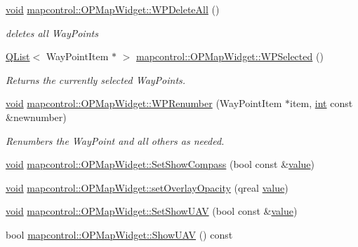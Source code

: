 \begin{DoxyCompactItemize}
\hyperlink{group___u_a_v_objects_plugin_ga444cf2ff3f0ecbe028adce838d373f5c}{void} \hyperlink{group___o_p_map_widget_ga2dd5bd06f443a496f6f81464ef44b614}{mapcontrol\-::\-O\-P\-Map\-Widget\-::\-W\-P\-Delete\-All} ()
\begin{DoxyCompactList}\small\item\em deletes all Way\-Points \end{DoxyCompactList}\item 
\hyperlink{class_q_list}{Q\-List}$<$ Way\-Point\-Item $\ast$ $>$ \hyperlink{group___o_p_map_widget_ga6051fad972405dd8b2a27196b4569684}{mapcontrol\-::\-O\-P\-Map\-Widget\-::\-W\-P\-Selected} ()
\begin{DoxyCompactList}\small\item\em Returns the currently selected Way\-Points. \end{DoxyCompactList}\item 
\hyperlink{group___u_a_v_objects_plugin_ga444cf2ff3f0ecbe028adce838d373f5c}{void} \hyperlink{group___o_p_map_widget_gaba5ee1743df3dee15e552f21a0c5d141}{mapcontrol\-::\-O\-P\-Map\-Widget\-::\-W\-P\-Renumber} (Way\-Point\-Item $\ast$item, \hyperlink{ioapi_8h_a787fa3cf048117ba7123753c1e74fcd6}{int} const \&newnumber)
\begin{DoxyCompactList}\small\item\em Renumbers the Way\-Point and all others as needed. \end{DoxyCompactList}\item 
\hyperlink{group___u_a_v_objects_plugin_ga444cf2ff3f0ecbe028adce838d373f5c}{void} \hyperlink{group___o_p_map_widget_ga6f97b86b2d7a7ca6f5b7bb65a70b5a96}{mapcontrol\-::\-O\-P\-Map\-Widget\-::\-Set\-Show\-Compass} (bool const \&\hyperlink{glext_8h_aa0e2e9cea7f208d28acda0480144beb0}{value})
\item 
\hyperlink{group___u_a_v_objects_plugin_ga444cf2ff3f0ecbe028adce838d373f5c}{void} \hyperlink{group___o_p_map_widget_ga989b4bdc242ebd97536cffb2be2193fc}{mapcontrol\-::\-O\-P\-Map\-Widget\-::set\-Overlay\-Opacity} (qreal \hyperlink{glext_8h_aa0e2e9cea7f208d28acda0480144beb0}{value})
\item 
\hyperlink{group___u_a_v_objects_plugin_ga444cf2ff3f0ecbe028adce838d373f5c}{void} \hyperlink{group___o_p_map_widget_ga0ced0790f99341bffe4d71cd8f1f3d61}{mapcontrol\-::\-O\-P\-Map\-Widget\-::\-Set\-Show\-U\-A\-V} (bool const \&\hyperlink{glext_8h_aa0e2e9cea7f208d28acda0480144beb0}{value})
\item 
bool \hyperlink{group___o_p_map_widget_ga07fb8db72de213248c524cae2b148d7a}{mapcontrol\-::\-O\-P\-Map\-Widget\-::\-Show\-U\-A\-V} () const 

\end{DoxyCompactItemize}
